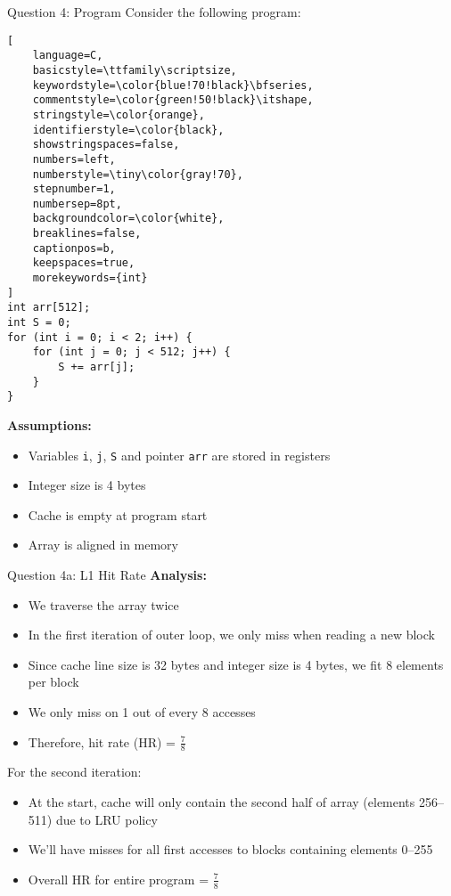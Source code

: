 \documentclass[aspectratio=169,12pt]{beamer}
\begin{document}
\begin{frame}[fragile]{Question 4: Program}
Consider the following program:

\begin{tcolorbox}[
    colback=blue!5,
    colframe=blue!40!black,
    boxrule=0.8pt,
    arc=3mm,
    left=3mm,
    right=3mm,
    top=2mm,
    bottom=2mm,
    fontupper=\footnotesize
]
\begin{lstlisting}[
    language=C,
    basicstyle=\ttfamily\scriptsize,
    keywordstyle=\color{blue!70!black}\bfseries,
    commentstyle=\color{green!50!black}\itshape,
    stringstyle=\color{orange},
    identifierstyle=\color{black},
    showstringspaces=false,
    numbers=left,
    numberstyle=\tiny\color{gray!70},
    stepnumber=1,
    numbersep=8pt,
    backgroundcolor=\color{white},
    breaklines=false,
    captionpos=b,
    keepspaces=true,
    morekeywords={int}
]
int arr[512];
int S = 0;
for (int i = 0; i < 2; i++) {
    for (int j = 0; j < 512; j++) {
        S += arr[j];
    }
}
\end{lstlisting}
\end{tcolorbox}

\vspace{0.3cm}
\textbf{Assumptions:}
\begin{itemize}
    \small
    \item Variables \texttt{i}, \texttt{j}, \texttt{S} and pointer \texttt{arr} are stored in registers
    \item Integer size is 4 bytes
    \item Cache is empty at program start
    \item Array is aligned in memory
\end{itemize}
\end{frame}

\begin{frame}{Question 4a: L1 Hit Rate}
\textbf{Analysis:}
\begin{itemize}
    \item We traverse the array twice
    \item In the first iteration of outer loop, we only miss when reading a new block
    \item Since cache line size is 32 bytes and integer size is 4 bytes, we fit 8 elements per block
    \item We only miss on 1 out of every 8 accesses
    \item Therefore, hit rate (HR) = $\frac{7}{8}$
\end{itemize}

For the second iteration:
\begin{itemize}
    \item At the start, cache will only contain the second half of array (elements 256--511) due to LRU policy
    \item We'll have misses for all first accesses to blocks containing elements 0--255
    \item Overall HR for entire program = $\frac{7}{8}$
\end{itemize}
\end{frame}
\end{document}
